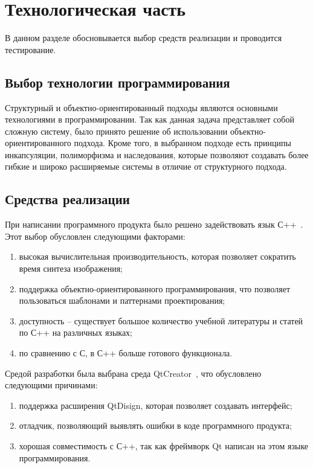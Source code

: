 \section{Технологическая часть}
В данном разделе обосновывается выбор средств реализации и проводится тестирование.

\subsection{Выбор технологии программирования}
Структурный и объектно-ориентированный подходы являются основными технологиями в программировании. Так как данная задача представляет собой сложную систему, было принято решение об использовании объектно-ориентированного подхода. Кроме того, в выбранном подходе есть принципы инкапсуляции, полиморфизма и наследования, которые позволяют создавать более гибкие и широко расширяемые системы в отличие от структурного подхода.

\subsection{Средства реализации}
При написании программного продукта было решено задействовать язык С++~\cite{cpp}. Этот выбор обусловлен следующими факторами:
\begin{enumerate}
	\item высокая вычислительная производительность, которая позволяет сократить время синтеза изображения;
	\item поддержка объектно-ориентированного программирования, что позволяет пользоваться шаблонами и паттернами проектирования;
	\item доступность – существует большое количество учебной литературы и статей по С++ на различных языках;
	\item по сравнению с С, в С++ больше готового функционала.
\end{enumerate}
Средой разработки была выбрана среда QtCreator~\cite{qt}, что обусловлено следующими причинами:
\begin{enumerate}
	\item поддержка расширения QtDisign, которая позволяет создавать интерфейс;
	\item отладчик, позволяющий выявлять ошибки в коде программного продукта;
	\item хорошая совместимость с С++, так как фреймворк Qt написан на этом языке программирования.
\end{enumerate}


